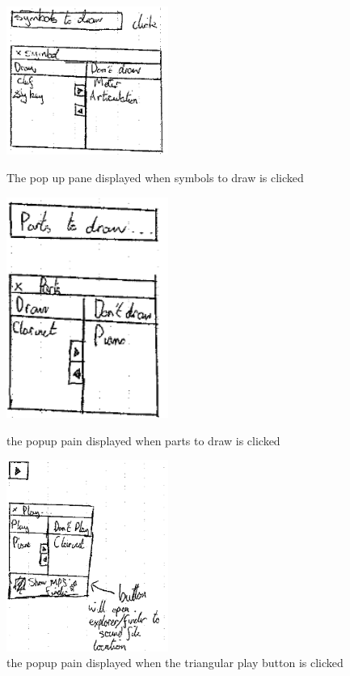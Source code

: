 \begin{appendices}
\begin{figure}[H]
\begin{minipage}{160pt}
\includegraphics[width=150pt]{designs/symbol_draw}
\caption{The pop up pane displayed when symbols to draw is clicked}	
\label{fig:symbols}
\end{minipage}
\begin{minipage}{160pt}
\centering
\includegraphics[width=150pt]{designs/part_draw}
\caption{the popup pain displayed when parts to draw is clicked}	
\label{fig:parts}
\end{minipage}
\begin{minipage}{160pt}
\includegraphics[width=150pt]{designs/play}
\caption{the popup pain displayed when the triangular play button is clicked}
\label{fig:play}
	

\end{minipage}
\end{figure}
\end{appendices}
